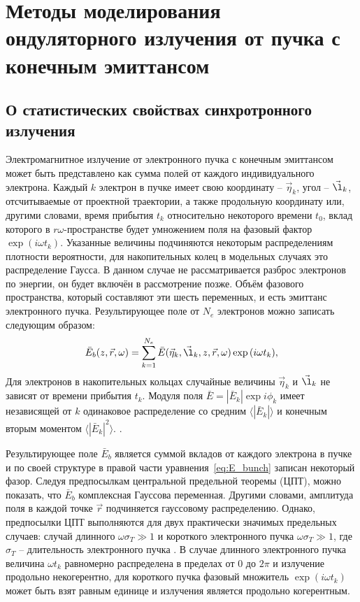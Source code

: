 
\chapter{Методы моделирования ондуляторного излучения от пучка с конечным эмиттансом} \label{chapt2}

\section{О статистических свойствах синхротронного излучения}
Электромагнитное излучение от электронного пучка с конечным эмиттансом может быть представлено как сумма полей от каждого индивидуального электрона. Каждый $k$ электрон в пучке имеет свою координату -- $\vec{\eta}_k$, угол -- $\vec{\l}_k$, отсчитываемые от проектной траектории, а также продольную координату или, другими словами, время прибытия $t_k$ относительно некоторого времени $t_0$, вклад которого в $r\omega$-пространстве будет умножением поля на фазовый фактор $\exp{(i \omega t_k)}$. Указанные величины подчиняются некоторым распределениям плотности вероятности, для накопительных колец в модельных случаях это распределение Гаусса. В данном случае не рассматривается разброс электронов по энергии, он будет включён в рассмотрение позже. Объём фазового пространства, который составляют эти шесть переменных, и есть эмиттанс электронного пучка. Результирующее поле от $N_e$ электронов можно записать следующим образом:
\begin{align}
	\bar{E}_{b} (z, \vec{r}, \omega) = \sum\limits_{k=1}^{N_e} \bar{E}(\vec{\eta}_k, \vec{\l}_k, z, \vec{r}, \omega) \exp{(i \omega t_k)},
	\label{eq:E_bunch} 
\end{align}
Для электронов в накопительных кольцах случайные величины $\vec{\eta}_k$ и $\vec{\l}_k$ не зависят от времени прибытия $t_k$. Модуля поля $\bar{E} = |\bar{E}_k|\exp{i\phi_k}$ имеет независящей от $k$ одинаковое распределение со средним $\big \langle|\bar{E}_k|\big \rangle$ и конечным вторым моментом  $\big \langle|\bar{E}_k|^2\big \rangle$. .

Результирующее поле $\bar{E}_{b}$ является суммой вкладов от каждого электрона в пучке и по своей структуре в правой части уравнения~\ref{eq:E_bunch} записан некоторый фазор. Следуя предпосылкам центральной предельной теоремы (ЦПТ), можно показать, что $\bar{E}_{b}$ комплексная Гауссова переменная. Другими словами, амплитуда поля в каждой точке $\vec{r}$ подчиняется гауссовому распределению. Однако, предпосылки ЦПТ выполняются для двух практически значимых предельных случаев: случай длинного $\omega\sigma_T \gg 1$ и короткого электронного пучка $\omega\sigma_T \gg 1$, где $\sigma_T$ -- длительность электронного пучка . В случае длинного электронного пучка величина $\omega t_k$ равномерно распределена в пределах от $0$ до $2\pi$ и излучение продольно некогерентно, для короткого пучка фазовый множитель $\exp{(i \omega t_k)}$ может быть взят равным единице и излучения является продольно когерентным. 

